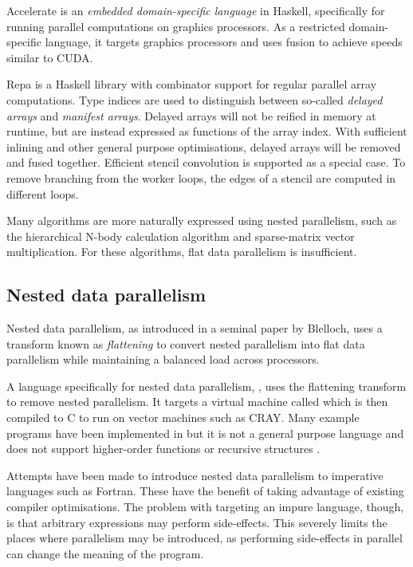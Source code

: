 Accelerate is an \emph{embedded domain-specific language} in Haskell, specifically for running parallel computations on graphics processors.
As a restricted domain-specific language, it targets graphics processors\cite{chakravarty2011accelerating} and uses fusion to achieve speeds similar to CUDA\cite{mcdonell2013optimising}.

Repa is a Haskell library with combinator support for regular parallel array computations\cite{keller2010regular}.
Type indices are used to distinguish between so-called \emph{delayed arrays} and \emph{manifest arrays}.
Delayed arrays will not be reified in memory at runtime, but are instead expressed as functions of the array index.
With sufficient inlining and other general purpose optimisations, delayed arrays will be removed and fused together\cite{lippmeier2012guiding}.
Efficient stencil convolution is supported as a special case.
To remove branching from the worker loops, the edges of a stencil are computed in different loops\cite{lippmeier2011efficient}.

Many algorithms are more naturally expressed using nested parallelism, such as the hierarchical N-body calculation\cite{barnes1986hierarchical} algorithm and sparse-matrix vector multiplication.
For these algorithms, flat data parallelism is insufficient.


\subsection{Nested data parallelism}
Nested data parallelism, as introduced in a seminal paper by Blelloch\cite{blelloch1990vector},
uses a transform known as \emph{flattening} to convert nested parallelism into flat data parallelism
while maintaining a balanced load across processors.

A language specifically for nested data parallelism, \nesl\cite{blelloch1995nesl},
uses the flattening transform to remove nested parallelism.
It targets a virtual machine called \vcode\cite{blelloch1993implementation}
which is then compiled to C to run on vector machines such as CRAY.
Many example programs have been implemented in \nesl\cite{blelloch1996programming}
but it is not a general purpose language and does not support higher-order functions\cite{leshchinskiy2005higher} or recursive structures \cite{keller1998flattening}.

Attempts have been made to introduce nested data parallelism to imperative languages such as Fortran\cite{au1997enlarging}.
These have the benefit of taking advantage of existing compiler optimisations.
The problem with targeting an impure language, though,
is that arbitrary expressions may perform side-effects.
This severely limits the places where parallelism may be introduced, as performing side-effects in parallel can change the meaning of the program.

